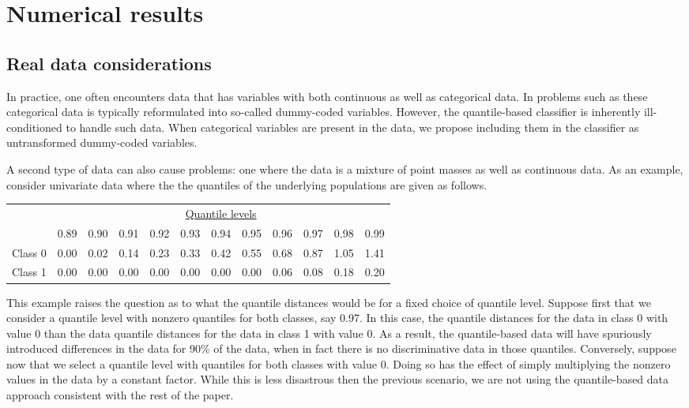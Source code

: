 

\section{Numerical results}
\label{sec:numerical-results}

\subsection{Real data considerations}

In practice, one often encounters data that has variables with both continuous
as well as categorical data.  In problems such as these categorical data is
typically reformulated into so-called dummy-coded variables.  However, the
quantile-based classifier is inherently ill-conditioned to handle such data.
When categorical variables are present in the data, we propose including them in
the classifier as untransformed dummy-coded variables.

A second type of data can also cause problems:  one where the data is a mixture
of point masses as well as continuous data.  As an example, consider univariate
data where the the quantiles of the underlying populations are given as follows.
\begin{center}
  \begin{tabular}{lrrrrrrrrrrr}
    \toprule
    & \multicolumn{11}{c}{\underline{Quantile levels}} \\
    & 0.89 & 0.90 & 0.91 & 0.92 & 0.93 & 0.94 & 0.95 & 0.96 & 0.97 & 0.98 & 0.99 \\
    \midrule
    Class 0 & 0.00 & 0.02 & 0.14 & 0.23 & 0.33 & 0.42 & 0.55 & 0.68 & 0.87 & 1.05 & 1.41 \\
    Class 1 & 0.00 & 0.00 & 0.00 & 0.00 & 0.00 & 0.00 & 0.00 & 0.06 & 0.08 & 0.18 & 0.20 \\
    \bottomrule
  \end{tabular}
\end{center}
This example raises the question as to what the quantile distances would be for
a fixed choice of quantile level.  Suppose first that we consider a quantile
level with nonzero quantiles for both classes, say 0.97.  In this case, the
quantile distances for the data in class 0 with value 0 than the data quantile
distances for the data in class 1 with value 0.  As a result, the quantile-based
data will have spuriously introduced differences in the data for 90\% of the
data, when in fact there is no discriminative data in those quantiles.
Conversely, suppose now that we select a quantile level with quantiles for both
classes with value 0.  Doing so has the effect of simply multiplying the nonzero
values in the data by a constant factor.  While this is less disastrous then the
previous scenario, we are not using the quantile-based data approach consistent
with the rest of the paper.

